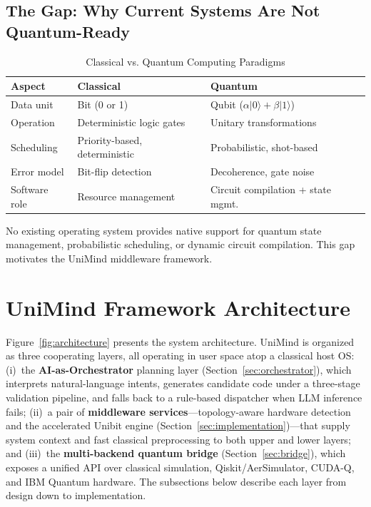 ﻿\documentclass[12pt,a4paper]{article}
\begin{document}
\subsection{The Gap: Why Current Systems Are Not Quantum-Ready}

\begin{table}[H]
\centering
\caption{Classical vs. Quantum Computing Paradigms}
\label{tab:comparison}
\small
\begin{tabular}{@{}lll@{}}
\hline
\textbf{Aspect} & \textbf{Classical} & \textbf{Quantum} \\
\hline
Data unit & Bit (0 or 1) & Qubit ($\alpha|0\rangle + \beta|1\rangle$) \\
Operation & Deterministic logic gates & Unitary transformations \\
Scheduling & Priority-based, deterministic & Probabilistic, shot-based \\
Error model & Bit-flip detection & Decoherence, gate noise \\
Software role & Resource management & Circuit compilation + state mgmt. \\
\hline
\end{tabular}
\end{table}

No existing operating system provides native support for quantum state management, probabilistic scheduling, or dynamic circuit compilation. This gap motivates the UniMind middleware framework.


\section{UniMind Framework Architecture}\label{sec:architecture}

Figure~\ref{fig:architecture} presents the system architecture. UniMind is organized as three cooperating layers, all operating in user space atop a classical host OS: (i)~the \textbf{AI-as-Orchestrator} planning layer (Section~\ref{sec:orchestrator}), which interprets natural-language intents, generates candidate code under a three-stage validation pipeline, and falls back to a rule-based dispatcher when LLM inference fails; (ii)~a pair of \textbf{middleware services}---topology-aware hardware detection and the accelerated Unibit engine (Section~\ref{sec:implementation})---that supply system context and fast classical preprocessing to both upper and lower layers; and (iii)~the \textbf{multi-backend quantum bridge} (Section~\ref{sec:bridge}), which exposes a unified API over classical simulation, Qiskit/AerSimulator, CUDA-Q, and IBM Quantum hardware. The subsections below describe each layer from design down to implementation.
\end{document}
